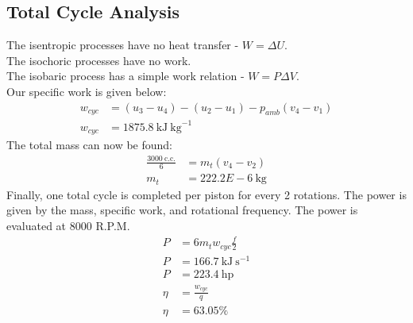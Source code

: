 \documentclass[10pt,a4paper]{article}
\begin{document}
	\subsection{Total Cycle Analysis}
	The isentropic processes have no heat transfer - $W = \Delta U$.\\
	The isochoric processes have no work.\\
	The isobaric process has a simple work relation - $W = P \Delta V$.\\
	Our specific work is given below:
	\begin{align}
		w_{cyc} &= (u_3-u_4) - (u_2-u_1) - p_{amb}(v_4 - v_1) \\
		w_{cyc} &= 1875.8\ \text{kJ}\ \text{kg}^{-1}
	\end{align}
	The total mass can now be found:
	\begin{align}
		\frac{3000\ \text{c.c.}}{6} &= m_t(v_4-v_2)\\
		m_t &= 222.2E-6\ \text{kg}
	\end{align}
	Finally, one total cycle is completed per piston for every 2 rotations. The power is given by the mass, specific work, and rotational frequency. The power is evaluated at 8000 R.P.M.
	\begin{align}
		P &= 6 m_t w_{cyc} \frac{f}{2}\\
		P &= 166.7\ \text{kJ}\ \text{s}^{-1}\\
		P &= 223.4\ \text{hp}\\
		\eta &= \frac{w_{cyc}}{q}\\
		\eta &= 63.05 \%
	\end{align}
\end{document}
